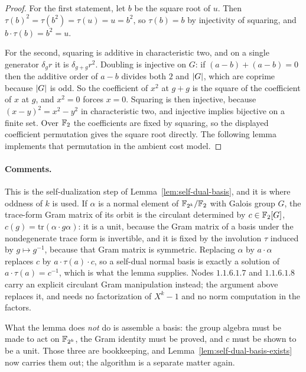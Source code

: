 \begin{proof}
\leanok
For the first statement, let $b$ be the square root of $u$. Then $\tau(b)^2 = \tau(b^2) =
\tau(u) = u = b^2$, so $\tau(b) = b$ by injectivity of squaring, and $b \cdot \tau(b) = b^2 = u$.

For the second, squaring is additive in characteristic two, and on a single generator
$\delta_g r$ it is $\delta_{g + g} r^2$. Doubling is injective on $G$: if $(a - b) + (a - b) =
0$ then the additive order of $a - b$ divides both $2$ and $\left\vert {G} \right\vert$, which are coprime because
$\left\vert {G} \right\vert$ is odd. So the coefficient of $x^2$ at $g + g$ is the square of the coefficient of $x$
at $g$, and $x^2 = 0$ forces $x = 0$. Squaring is then injective, because $(x - y)^2 = x^2 -
y^2$ in characteristic two, and injective implies bijective on a finite set.
Over $\mathbb{F}_2$ the coefficients are fixed by squaring, so the displayed coefficient
permutation gives the square root directly. The following lemma implements that
permutation in the ambient cost model.
\end{proof}

\paragraph{Comments.} This is the self-dualization step of Lemma~\ref{lem:self-dual-basis}, and
it is where oddness of $k$ is used. If $\alpha$ is a normal element of $\mathbb{F}_{2^k}/\mathbb{F}_2$ with
Galois group $G$, the trace-form Gram matrix of its orbit is the circulant determined by
$c \in \mathbb{F}_2[G]$, $c(g) = \mathrm{tr}(\alpha \cdot g\alpha)$: it is a unit, because the Gram
matrix of a basis under the nondegenerate trace form is invertible, and it is fixed by the
involution $\tau$ induced by $g \mapsto g^{-1}$, because that Gram matrix is symmetric.
Replacing $\alpha$ by $a \cdot \alpha$ replaces $c$ by $a \cdot \tau(a) \cdot c$, so a self-dual
normal basis is exactly a solution of $a \cdot \tau(a) = c^{-1}$, which is what the lemma
supplies. Nodes $1.1.6.1.7$ and $1.1.6.1.8$ carry an explicit circulant Gram manipulation
instead; the argument above replaces it, and needs no factorization of $X^k - 1$ and no norm
computation in the factors.

What the lemma does \emph{not} do is assemble a basis: the group algebra must be made to act on
$\mathbb{F}_{2^k}$, the Gram identity must be proved, and $c$ must be shown to be a unit. Those three
are bookkeeping, and Lemma~\ref{lem:self-dual-basis-exists} now carries them out; the algorithm
is a separate matter again.


